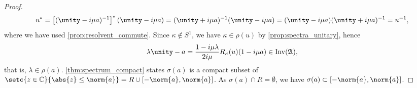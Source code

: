 \begin{proof}
\begin{equation*}
        u^* = \left[(\unity - i \mu a)^{-1}\right]^*(\unity - i\mu a) = (\unity + i \mu a)^{-1} (\unity - i \mu a) = (\unity - i \mu a)(\unity + i \mu a)^{-1} = u^{-1},
    \end{equation*}
    where we have used \cref{prop:resolvent_commute}. Since \(\kappa \notin S^1\), we have \(\kappa \in \rho(u)\) by \cref{prop:spectra_unitary}, hence
    \begin{equation*}
        \lambda \unity - a = \frac{1 - i \mu \lambda}{2i \mu} R_{\kappa}(u)(1 - i \mu a) \in \invertible{\algebra{A}},
    \end{equation*}
    that is, \(\lambda \in \rho(a)\). \cref{thm:spectrum_compact} states \(\sigma(a)\) is a compact subset of \(\setc{z \in \mathbb{C}}{\abs{z} \leq \norm{a}} = R \cup [-\norm{a}, \norm{a}]\). As \(\sigma(a) \cap R = \emptyset\), we have \(\sigma(a) \subset [-\norm{a}, \norm{a}]\).
\end{proof}
